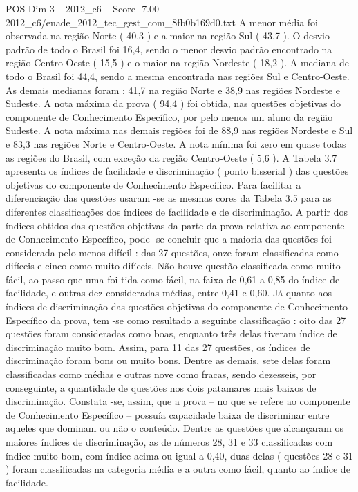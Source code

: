 \begin{textsample}{POS Dim 3 – 2012\_c6 – Score -7.00 – 2012\_c6/enade\_2012\_tec\_gest\_com\_8fb0b169d0.txt}
A menor média foi observada na região Norte ( 40,3 ) e a maior na região Sul ( 43,7 ).
O desvio padrão de todo o Brasil foi 16,4, sendo o menor desvio padrão encontrado na região Centro-Oeste ( 15,5 ) e o maior na região Nordeste ( 18,2 ).
A mediana de todo o Brasil foi 44,4, sendo a mesma encontrada nas regiões Sul e Centro-Oeste.
As demais medianas foram : 41,7 na região Norte e 38,9 nas regiões Nordeste e Sudeste.
A nota máxima da prova ( 94,4 ) foi obtida, nas questões objetivas do componente de Conhecimento Específico, por pelo menos um aluno da região Sudeste.
A nota máxima nas demais regiões foi de 88,9 nas regiões Nordeste e Sul e 83,3 nas regiões Norte e Centro-Oeste.
A nota mínima foi zero em quase todas as regiões do Brasil, com exceção da região Centro-Oeste ( 5,6 ).
A Tabela 3.7 apresenta os índices de facilidade e discriminação ( ponto bisserial ) das questões objetivas do componente de Conhecimento Específico.
Para facilitar a diferenciação das questões usaram -se as mesmas cores da Tabela 3.5 para as diferentes classificações dos índices de facilidade e de discriminação.
A partir dos índices obtidos das questões objetivas da parte da prova relativa ao componente de Conhecimento Específico, pode -se concluir que a maioria das questões foi considerada pelo menos difícil : das 27 questões, onze foram classificadas como difíceis e cinco como muito difíceis.
Não houve questão classificada como muito fácil, ao passo que uma foi tida como fácil, na faixa de 0,61 a 0,85 do índice de facilidade, e outras dez consideradas médias, entre 0,41 e 0,60.
Já quanto aos índices de discriminação das questões objetivas do componente de Conhecimento Específico da prova, tem -se como resultado a seguinte classificação : oito das 27 questões foram consideradas como boas, enquanto três delas tiveram índice de discriminação muito bom.
Assim, para 11 das 27 questões, os índices de discriminação foram bons ou muito bons.
Dentre as demais, sete delas foram classificadas como médias e outras nove como fracas, sendo dezesseis, por conseguinte, a quantidade de questões nos dois patamares mais baixos de discriminação.
Constata -se, assim, que a prova – no que se refere ao componente de Conhecimento Específico – possuía capacidade baixa de discriminar entre aqueles que dominam ou não o conteúdo.
Dentre as questões que alcançaram os maiores índices de discriminação, as de números 28, 31 e 33 classificadas com índice muito bom, com índice acima ou igual a 0,40, duas delas ( questões 28 e 31 ) foram classificadas na categoria média e a outra como fácil, quanto ao índice de facilidade.

\end{textsample}
